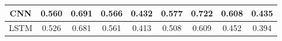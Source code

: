 \documentclass[12pt]{article}
\begin{document}
\begin{center}
\begin{tabular}{|c||c|c|c|c||c|c|c|c|}
			\cellcolor{green!15}CNN & 0.560 & 0.691 & 0.566 & 0.432 & 0.577 & 0.722 & 0.608 & 0.435 \\ \hline
			\cellcolor{green!15}LSTM & 0.526 & 0.681 & 0.561 & 0.413 & 0.508 & 0.609 & 0.452 & 0.394 \\ \hline
		\end{tabular}

\end{center}
\end{document}
